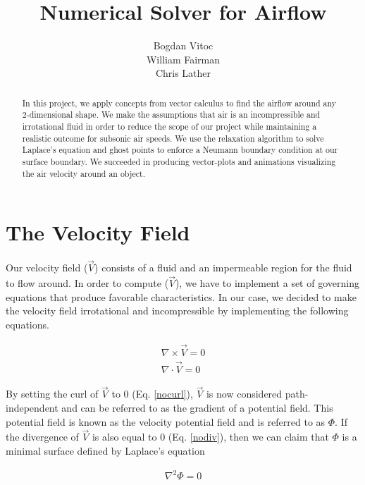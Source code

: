 \documentclass[11pt]{article}
\begin{document}
\title{Numerical Solver for Airflow}
\author{Bogdan Vitoc \\ William Fairman \\ Chris Lather}
\maketitle



\begin{abstract}
   In this project, we apply concepts from vector calculus to find the airflow around any 2-dimensional shape. We make the assumptions that air is an incompressible and irrotational fluid in order to reduce the scope of our project while maintaining a realistic outcome for subsonic air speeds. We use the relaxation algorithm to solve Laplace's equation and ghost points to enforce a Neumann boundary condition at our surface boundary. We succeeded in producing vector-plots and animations visualizing the air velocity around an object.
\end{abstract}


\section{The Velocity Field}
Our velocity field ($\vec{V}$) consists of a fluid and an impermeable region for the fluid to flow around. In order to compute ($\vec{V}$), we have to implement a set of governing equations that produce favorable characteristics. In our case, we decided to make the velocity field irrotational and incompressible by implementing the following equations.

\begin{align}
    \nabla \times \vec{V} = 0 \label{nocurl} \\
    \nabla \cdot \vec{V} = 0 \label{nodiv}
\end{align}

By setting the curl of $\vec{V}$ to 0 (Eq. \ref{nocurl}), $\vec{V}$ is now considered path-independent and can be referred to as the gradient of a potential field. This potential field is known as the velocity potential field and is referred to as $\Phi$. If the divergence of $\vec{V}$ is also equal to 0 (Eq. \ref{nodiv}), then we can claim that $\Phi$ is a minimal surface defined by Laplace's equation 

\begin{align}
    \nabla^2 \Phi = 0
\end{align}
\end{document}
